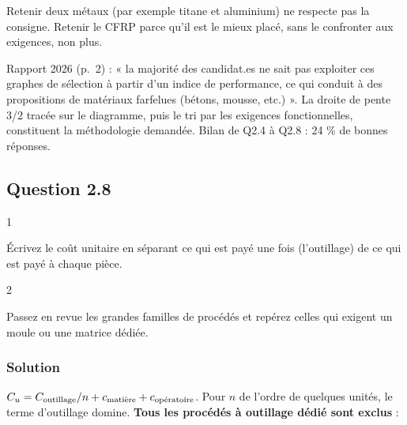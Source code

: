\documentclass[11pt,a4paper]{article}
\begin{document}
\begin{piege}

Retenir deux métaux (par exemple titane et aluminium) ne respecte pas la consigne. Retenir le CFRP parce qu'il est le mieux placé, sans le confronter aux exigences, non plus.

\end{piege}

\begin{jury}

Rapport 2026 (p.~2) : « la majorité des candidat.es ne sait pas exploiter ces graphes de sélection à partir d'un indice de performance, ce qui conduit à des propositions de matériaux farfelues (bétons, mousse, etc.) ». La droite de pente 3/2 tracée sur le diagramme, puis le tri par les exigences fonctionnelles, constituent la méthodologie demandée. Bilan de Q2.4 à Q2.8 : 24 \% de bonnes réponses.

\end{jury}

\hypertarget{question-2.8}{%
\subsection{Question 2.8}\label{question-2.8}}

\begin{indication}{1}

Écrivez le coût unitaire en séparant ce qui est payé une fois (l'outillage) de ce qui est payé à chaque pièce.

\end{indication}

\begin{indication}{2}

Passez en revue les grandes familles de procédés et repérez celles qui exigent un moule ou une matrice dédiée.

\end{indication}

\hypertarget{solution-21}{%
\subsubsection{Solution}\label{solution-21}}

\(C_u = C_{\text{outillage}}/n + c_{\text{\text{matière}}} + c_{\text{\text{opératoire}}}\). Pour \(n\) de l'ordre de quelques unités, le terme d'outillage domine. \textbf{Tous les procédés à outillage dédié sont exclus} :
\end{document}
